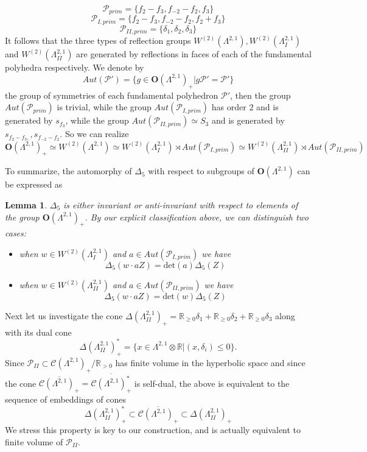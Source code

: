 \documentclass[9pt]{amsart} \usepackage[utf8]{inputenc}
\newtheorem{lemma}{Lemma}
\newcommand{\R}{\mathbb{R}} \newcommand{\La}{\Lambda}
\newcommand{\Orth}{\mathbf{O}}
\newcommand{\Cone}{\mathcal{C}}
\newcommand{\Poly}{\mathcal{P}}
\begin{document}
 $$\Poly_{prim} = \{f_2 - f_3, f_{-2} - f_2, f_3\}$$
 $$\Poly_{I,prim} = \{f_2 -f_3, f_{-2} - f_2, f_2 + f_3\}$$
 $$\Poly_{II,prim} = \{\delta_1, \delta_2, \delta_3\}$$
It follows that the three types of reflection groups $W^{(2)}(\La^{2,1}),
W^{(2)}(\La^{2,1}_I)$ and $W^{(2)}(\La^{2,1}_{II})$ are generated by
reflections in faces of each of the fundamental polyhedra respectively. We denote
by $$Aut(\Poly') = \{g \in \Orth(\La^{2,1})_+ | g \Poly' = \Poly' \}$$ the
group of symmetries of each fundamental polyhedron $\Poly'$, then the group
$Aut(\Poly_{prim})$ is trivial, while the group $Aut(\Poly_{I,prim})$ has order
$2$ and is generated by $s_{f_3}$, while the group $Aut(\Poly_{II,prim})
\simeq S_3$ and is generated by $s_{f_2 -f_3,}, s_{f_{-2} - f_2}$. So we
can realize $$\Orth(\La^{2,1})_+ \simeq W^{(2)}(\La^{2,1}) \simeq
W^{(2)}(\La^{2,1}_I) \rtimes Aut(\Poly_{I,prim}) \simeq
W^{(2)}(\La^{2,1}_{II}) \rtimes Aut(\Poly_{II,prim})$$

To summarize, the automorphy of $\Delta_5$ with respect to subgroups of
$\Orth(\La^{2,1})$ can be expressed as

\begin{lemma}
$\Delta_5$ is either invariant or anti-invariant with respect to elements
of the group $\Orth(\La^{2,1})_+$. By our explicit classification above, we can
distinguish two cases:
\begin{itemize}
  \item when $w \in W^{(2)}(\La^{2,1}_I)$ and $a \in Aut(\Poly_{I,prim})$ we
  have
  $$\Delta_5(w \cdot a Z) = \text{det}(a) \Delta_5(Z)$$
  \item when $w \in W^{(2)}(\La^{2,1}_{II})$ and $a \in Aut(\Poly_{II,prim})$ we
  have
  $$\Delta_5(w \cdot a Z) = \text{det}(w) \Delta_5(Z)$$
\end{itemize}

\end{lemma}

Next let us investigate the cone $\Delta(\La^{2,1}_{II})_+ = \R_{\geq 0} \delta_1 + \R_{\geq 0} \delta_2
+ \R_{\geq 0} \delta_3$ along with its dual cone
$$\Delta(\La^{2,1}_{II})_+^* = \{ x \in \La^{2,1} \otimes \R | (x,
\delta_i) \leq 0 \}.$$ Since $\Poly_{II} \subset \Cone(\La^{2,1})_+ /
\R_{>0}$ has finite volume in the hyperbolic space and since the cone
$\overline{\Cone(\La^{2,1})_+} = \overline{\Cone(\La^{2,1})_+^*}$ is
self-dual, the above is equivalent to the sequence of embeddings of
cones
$$\Delta(\La^{2,1}_{II})_+^* \subset
\overline{\Cone(\La^{2,1})_+} \subset  \Delta(\La^{2,1}_{II})_+$$
We stress this property is key to our construction, and is actually equivalent to
finite volume of $\Poly_{II}$.
\end{document}

